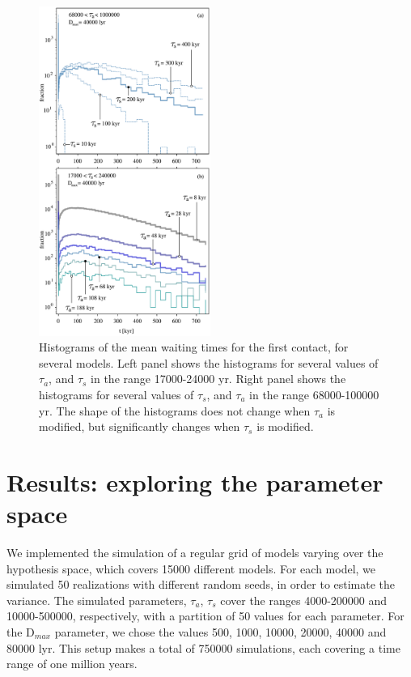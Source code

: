 \documentclass[crop]{CSLB}%
\begin{document}
\begin{figure}
   \centering
   \includegraphics[width=0.5\textwidth]{waiting_s+a_dif_ylog.pdf}
   \caption{Histograms of the mean waiting times for the first contact, for
   several models.
   Left panel shows the histograms for several values of $\tau_a$, and
   $\tau_s$ in the range 17000-24000 yr.
   Right panel shows the histograms for several values of $\tau_s$, and
   $\tau_a$ in the range 68000-100000 yr.
   The shape of the histograms does not change when $\tau_a$ is
   modified, but significantly changes when $\tau_s$ is modified.
   }
   \label{F_waiting_for_1C}
\end{figure}

                       

\section{Results: exploring the parameter space}\label{S_results}

We implemented the simulation of a regular grid of models varying over
the hypothesis space, which covers 15000 different models.
%
For each model, we simulated 50 realizations with different random
seeds, in order to estimate the variance.
%
The simulated parameters, $\tau_a$, $\tau_s$ cover the ranges
4000-200000 and 10000-500000, respectively, with a partition of 50
values for each parameter.
%
For the D$_{max}$ parameter, we chose the values 500, 1000, 10000,
20000, 40000 and 80000 lyr.
%
This setup makes a total of 750000 simulations, each covering a time
range of one million years.
\end{document}
